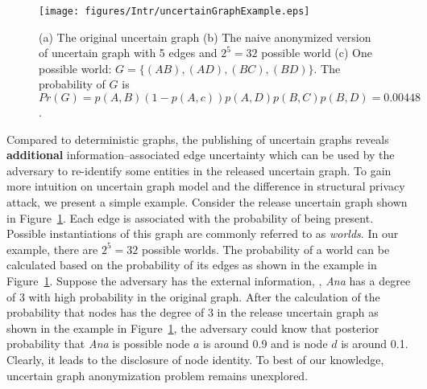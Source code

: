 \begin{figure}[t!]
    \centering 
    \texttt{[image: figures/Intr/uncertainGraphExample.eps]}
    \caption{\small{(a) The original uncertain graph (b) The naive anonymized version of uncertain graph with 5 edges and $2^{5}=32$ possible world} (c) One possible world: $G=\lbrace(AB),(AD),(BC),(BD) \rbrace$. The probability of $G$ is $Pr(G)=p(A,B) (1-p(A,c)) p(A,D) p(B,C) p(B,D)=0.00448$.}
    \label{fig:intr:uncertainGraph}
\end{figure}

Compared to deterministic graphs, the publishing of uncertain graphs reveals \textbf{additional} information--associated edge uncertainty which can be used by the adversary to re-identify some entities in the released uncertain graph. To gain more intuition on uncertain graph model and the difference in structural privacy attack, we present a simple example. Consider the release uncertain graph shown in Figure~\ref{fig:intr:uncertainGraph}. Each edge is associated with the probability of being present. Possible instantiations of this graph are commonly referred to as \emph{worlds}. In our example, there are $2^5=32$ possible worlds. The probability of a world can be calculated based on the probability of its edges as shown in the example in Figure~\ref{fig:intr:uncertainGraph}. Suppose the adversary has the external information, {\ie}, {\em Ana} has a degree of $3$ with high probability in the original graph. After the calculation of the probability that nodes has the degree of $3$ in the release uncertain graph as shown in the example in Figure~\ref{fig:intr:uncertainGraph}, the adversary could know that posterior probability that {\em Ana} is possible node $a$ is around 0.9 and is node $d$ is around 0.1. Clearly, it leads to the disclosure of node identity. To best of our knowledge, uncertain graph anonymization problem remains unexplored. 


